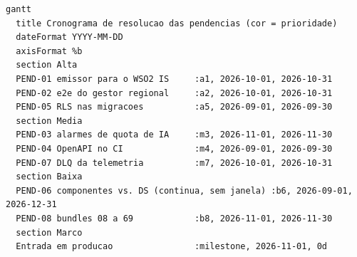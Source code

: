 \begin{lstlisting}[language=mermaid]
gantt
  title Cronograma de resolucao das pendencias (cor = prioridade)
  dateFormat YYYY-MM-DD
  axisFormat %b
  section Alta
  PEND-01 emissor para o WSO2 IS     :a1, 2026-10-01, 2026-10-31
  PEND-02 e2e do gestor regional     :a2, 2026-10-01, 2026-10-31
  PEND-05 RLS nas migracoes          :a5, 2026-09-01, 2026-09-30
  section Media
  PEND-03 alarmes de quota de IA     :m3, 2026-11-01, 2026-11-30
  PEND-04 OpenAPI no CI              :m4, 2026-09-01, 2026-09-30
  PEND-07 DLQ da telemetria          :m7, 2026-10-01, 2026-10-31
  section Baixa
  PEND-06 componentes vs. DS (continua, sem janela) :b6, 2026-09-01, 2026-12-31
  PEND-08 bundles 08 a 69            :b8, 2026-11-01, 2026-11-30
  section Marco
  Entrada em producao                :milestone, 2026-11-01, 0d
\end{lstlisting}
